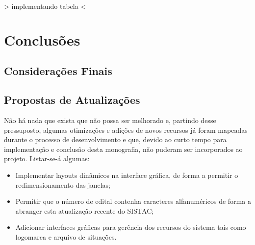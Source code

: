 \documentclass[
	12pt,			%
	openright,		%
	oneside,	
	a4paper,		%
	english,		%
	brazil			%
]{abntex2/abntex2}  %
\begin{document}
	{\textgreater} implementando tabela {\textless}

	\chapter{Conclusões}
	
		\section{Considerações Finais}
	
		\section{Propostas de Atualizações}
		
			Não há nada que exista que não possa ser melhorado e, partindo desse pressuposto, algumas otimizações e adições de novos recursos já foram mapeadas durante o processo de desenvolvimento e que, devido ao curto tempo para implementação e conclusão desta monografia, não puderam ser incorporados ao projeto. Listar-se-á algumas:
			
			\begin{itemize}
				
				\item Implementar layouts dinâmicos na interface gráfica, de forma a permitir o redimensionamento das janelas;
				\item Permitir que o número de edital contenha caracteres alfanuméricos de forma a abranger esta atualização recente do SISTAC;
				\item Adicionar interfaces gráficas para gerência dos recursos do sistema tais como logomarca e arquivo de situações.
				
			\end{itemize}

\postextual
{}

\end{document}
